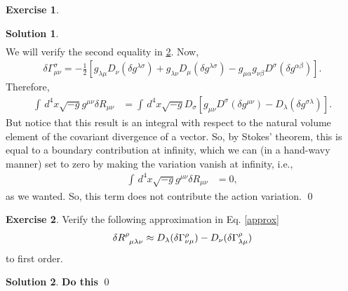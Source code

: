 \documentclass{book}
\numberwithin{equation}{section}
\theoremstyle{definition}
\newtheorem{exmp}{Exercise}[section]
\newtheorem{sln}{Solution}[section]
\newcommand{\f}[2]{\frac{#1}{#2}}
\newcommand{\lb}{\left[}
\newcommand{\rb}{\right]}
\begin{document}
\begin{exmp}
\begin{sln}
\begin{align}
		\end{align}
		We will verify the second equality in \ref{exer}. Now,
		\begin{align}
		\delta \Gamma^\sigma_{\mu\nu} = -\f{1}{2}\lb g_{\lambda\mu}D_\nu (\delta g^{\lambda\sigma}) + g_{\lambda\nu} D_\mu (\delta g^{\lambda\sigma}) - g_{\mu\alpha}g_{\nu\beta} D^\sigma (\delta g^{\alpha\beta}) \rb.
		\end{align}
		Therefore,
		\begin{align}
		\int \,d^4x \sqrt{-g}g^{\mu\nu}\delta R_{\mu\nu} &= \int\,d^4x \sqrt{-g} D_\sigma \lb g_{\mu\nu}D^\sigma (\delta g^{\mu\nu}) - D_\lambda (\delta g^{\sigma\lambda}) \rb.
		\end{align}
		But notice that this result is an integral with respect to the natural volume element of the covariant divergence of a vector. So, by Stokes' theorem, this is equal to a boundary contribution at infinity, which we can (in a hand-wavy manner) set to zero by making the variation vanish at infinity, i.e., 
		\begin{align}
		\int \,d^4x \sqrt{-g}g^{\mu\nu}\delta R_{\mu\nu} &= 0,
		\end{align}
		as we wanted. So, this term does not contribute the action variation.  \qed \\
		
		
		
		
	\end{sln}
\end{exmp}

\begin{exmp}\label{exer}
	Verify the following approximation in Eq. \eqref{approx}
	\begin{align}
	\delta \tensor{R}{^\rho_{\mu\lambda\nu}} \approx D_\lambda (\delta \Gamma^\rho_{\nu\mu}) - D_\nu (\delta \Gamma^\rho_{\lambda\mu})
	\end{align}
	to first order.\\
	
	\begin{sln}
		\textbf{Do this} \qed\\
	\end{sln}
\end{exmp}
\end{document}
